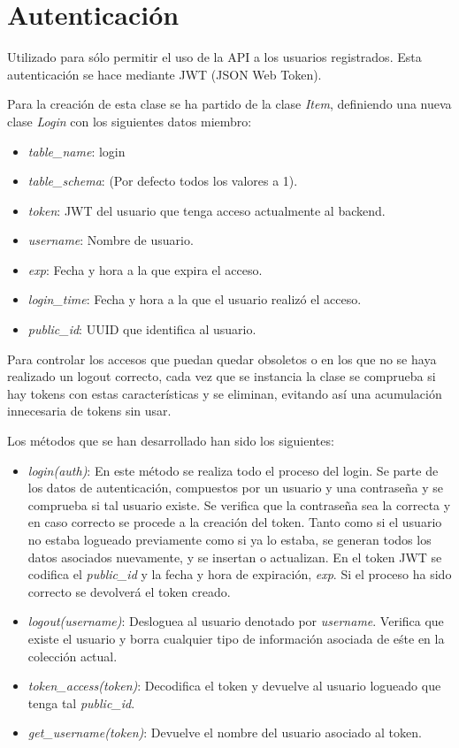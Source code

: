 \section{Autenticación}

Utilizado para sólo permitir el uso de la API a los usuarios registrados. Esta autenticación se hace mediante JWT (JSON Web Token).

\bigskip
Para la creación de esta clase se ha partido de la clase \textit{Item}, definiendo una nueva clase \textit{Login} con los siguientes datos miembro:
\begin{itemize}
	\item \textit{table\_name}: login
	\item \textit{table\_schema}: (Por defecto todos los valores a 1).
	\item \textit{token}: JWT del usuario que tenga acceso actualmente al backend.
	\item \textit{username}: Nombre de usuario.
	\item \textit{exp}: Fecha y hora a la que expira el acceso.
	\item \textit{login\_time}: Fecha y hora a la que el usuario realizó el acceso.
	\item \textit{public\_id}: UUID que identifica al usuario.
\end{itemize}



\bigskip
Para controlar los accesos que puedan quedar obsoletos o en los que no se haya realizado un logout correcto, cada vez que se instancia la clase se comprueba si hay tokens con estas características y se eliminan, evitando así una acumulación innecesaria de tokens sin usar.

\bigskip
Los métodos que se han desarrollado han sido los siguientes:

\begin{itemize}
	\item \textit{login(auth)}: En este método se realiza todo el proceso del login. Se parte de los datos de autenticación, compuestos por un usuario y una contraseña y se comprueba si tal usuario existe. Se verifica que la contraseña sea la correcta y en caso correcto se procede a la creación del token. Tanto como si el usuario no estaba logueado previamente como si ya lo estaba, se generan todos los datos asociados nuevamente, y se insertan o actualizan. En el token JWT se codifica el \textit{public\_id} y la fecha y hora de expiración, \textit{exp}. Si el proceso ha sido correcto se devolverá el token creado.
	\item \textit{logout(username)}: Desloguea al usuario denotado por \textit{username}. Verifica que existe el usuario y borra cualquier tipo de información asociada de eśte en la colección actual.
	\item \textit{token\_access(token)}: Decodifica el token y devuelve al usuario logueado que tenga tal \textit{public\_id}.
	\item \textit{get\_username(token)}: Devuelve el nombre del usuario asociado al token.
\end{itemize}




